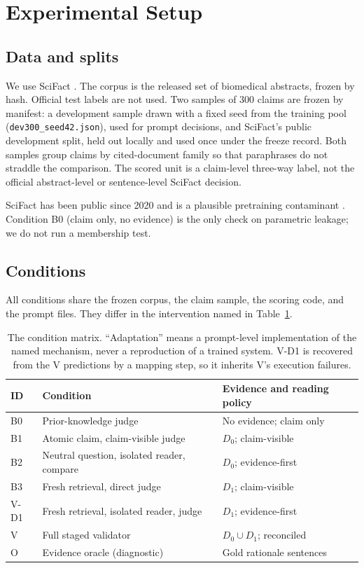 \documentclass[11pt,a4paper]{article}
\newcommand{\Dzero}{\ensuremath{D_0}}
\newcommand{\Done}{\ensuremath{D_1}}
\newcommand{\Dunion}{\ensuremath{D_0 \cup D_1}}
\begin{document}
\section{Experimental Setup}

\subsection{Data and splits}

We use SciFact \citep{wadden2020scifact}. The corpus is the released set
of biomedical abstracts, frozen by hash. Official test labels are not
used. Two samples of 300 claims are frozen by manifest: a development
sample drawn with a fixed seed from the training pool
(\texttt{dev300\_seed42.json}), used for prompt decisions, and SciFact's
public development split, held out locally and used once under the freeze
record. Both samples group claims by cited-document family so that
paraphrases do not straddle the comparison. The scored unit is a
claim-level three-way label, not the official abstract-level or
sentence-level SciFact decision.

SciFact has been public since 2020 and is a plausible pretraining
contaminant \citep{jacovi2023contamination}. Condition B0 (claim only, no
evidence) is the only check on parametric leakage; we do not run a
membership test.

\subsection{Conditions}

All conditions share the frozen corpus, the claim sample, the scoring
code, and the prompt files. They differ in the intervention named in
Table~\ref{tab:conditions}.

\begin{table}[t]
\centering
\caption{The condition matrix. ``Adaptation'' means a prompt-level
implementation of the named mechanism, never a reproduction of a trained
system. V-D1 is recovered from the V predictions by a mapping step, so it
inherits V's execution failures.}
\label{tab:conditions}
\begin{tabular}{lll}
\toprule
ID & Condition & Evidence and reading policy \\
\midrule
B0 & Prior-knowledge judge & No evidence; claim only \\
B1 & Atomic claim, claim-visible judge & $\Dzero$; claim-visible \\
B2 & Neutral question, isolated reader, compare & $\Dzero$; evidence-first \\
B3 & Fresh retrieval, direct judge & $\Done$; claim-visible \\
V-D1 & Fresh retrieval, isolated reader, judge & $\Done$; evidence-first \\
V & Full staged validator & $\Dunion$; reconciled \\
O & Evidence oracle (diagnostic) & Gold rationale sentences \\
\bottomrule
\end{tabular}
\end{table}
\end{document}
